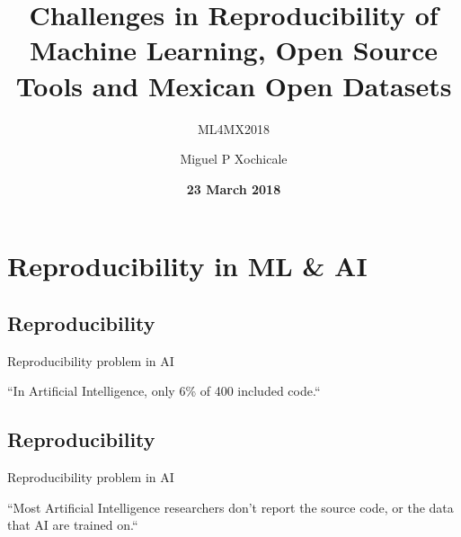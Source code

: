 \documentclass[compress]{beamer}
\title{Challenges in Reproducibility of \\  Machine Learning, Open Source Tools and Mexican Open Datasets}
\subtitle{ML4MX2018}
\date{{\bf 23 March 2018}}
\author{Miguel P Xochicale}
\institute{School of Engineering \\{\bf University of Birmingham}}
\begin{document}



\closingtitle




%
\section{Reproducibility in ML \& AI}


\subsection{Reproducibility}
{


    \begin{frame}{Reproducibility problem in AI}
	\LARGE

	``In Artificial Intelligence, only 6\% of 400 included code.`` 
  
	

 \end{frame}

}



\subsection{Reproducibility}
{


    \begin{frame}{Reproducibility problem in AI}
	\LARGE

	``Most Artificial Intelligence researchers don't report the source code, or the data that AI are trained on.`` 
   

\end{frame}


}
\end{document}
